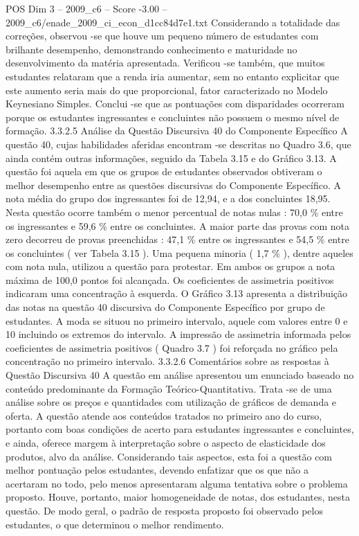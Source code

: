 \begin{textsample}{POS Dim 3 – 2009\_c6 – Score -3.00 – 2009\_c6/enade\_2009\_ci\_econ\_d1cc84d7e1.txt}
Considerando a totalidade das correções, observou -se que houve um pequeno número de estudantes com brilhante desempenho, demonstrando conhecimento e maturidade no desenvolvimento da matéria apresentada.
Verificou -se também, que muitos estudantes relataram que a renda iria aumentar, sem no entanto explicitar que este aumento seria mais do que proporcional, fator caracterizado no Modelo Keynesiano Simples.
Conclui -se que as pontuações com disparidades ocorreram porque os estudantes ingressantes e concluintes não possuem o mesmo nível de formação. 3.3.2.5 Análise da Questão Discursiva 40 do Componente Específico A questão 40, cujas habilidades aferidas encontram -se descritas no Quadro 3.6, que ainda contém outras informações, seguido da Tabela 3.15 e do Gráfico 3.13.
A questão foi aquela em que os grupos de estudantes observados obtiveram o melhor desempenho entre as questões discursivas do Componente Específico.
A nota média do grupo dos ingressantes foi de 12,94, e a dos concluintes 18,95.
Nesta questão ocorre também o menor percentual de notas nulas : 70,0 \% entre os ingressantes e 59,6 \% entre os concluintes.
A maior parte das provas com nota zero decorreu de provas preenchidas : 47,1 \% entre os ingressantes e 54,5 \% entre os concluintes ( ver Tabela 3.15 ).
Uma pequena minoria ( 1,7 \% ), dentre aqueles com nota nula, utilizou a questão para protestar.
Em ambos os grupos a nota máxima de 100,0 pontos foi alcançada.
Os coeficientes de assimetria positivos indicaram uma concentração à esquerda.
O Gráfico 3.13 apresenta a distribuição das notas na questão 40 discursiva do Componente Específico por grupo de estudantes.
A moda se situou no primeiro intervalo, aquele com valores entre 0 e 10 incluindo os extremos do intervalo.
A impressão de assimetria informada pelos coeficientes de assimetria positivos ( Quadro 3.7 ) foi reforçada no gráfico pela concentração no primeiro intervalo. 3.3.2.6 Comentários sobre as respostas à Questão Discursiva 40 A questão em análise apresentou um enunciado baseado no conteúdo predominante da Formação Teórico-Quantitativa.
Trata -se de uma análise sobre os preços e quantidades com utilização de gráficos de demanda e oferta.
A questão atende aos conteúdos tratados no primeiro ano do curso, portanto com boas condições de acerto para estudantes ingressantes e concluintes, e ainda, oferece margem à interpretação sobre o aspecto de elasticidade dos produtos, alvo da análise.
Considerando tais aspectos, esta foi a questão com melhor pontuação pelos estudantes, devendo enfatizar que os que não a acertaram no todo, pelo menos apresentaram alguma tentativa sobre o problema proposto.
Houve, portanto, maior homogeneidade de notas, dos estudantes, nesta questão.
De modo geral, o padrão de resposta proposto foi observado pelos estudantes, o que determinou o melhor rendimento.

\end{textsample}
